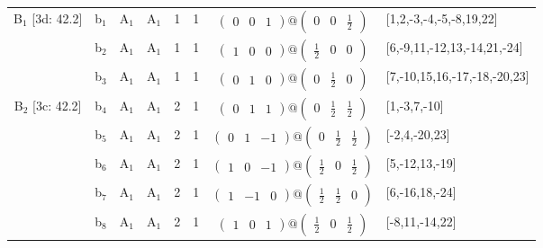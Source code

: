 \documentclass[fleqn,10pt,landscape]{article}
\begin{document}
\begin{itemize}
\begin{center}
\begin{longtable}{cc|cc|c|c|c|l}
B$_{1}$ [3d: 42.2] & b$_{1}$ & A$_{1}$ & A$_{1}$ & 1 & 1 & $\begin{pmatrix} 0 & 0 & 1 \end{pmatrix}@\begin{pmatrix} 0 & 0 & \frac{1}{2} \end{pmatrix}$ & [1,2,-3,-4,-5,-8,19,22] \\
& b$_{2}$ & A$_{1}$ & A$_{1}$ & 1 & 1 & $\begin{pmatrix} 1 & 0 & 0 \end{pmatrix}@\begin{pmatrix} \frac{1}{2} & 0 & 0 \end{pmatrix}$ & [6,-9,11,-12,13,-14,21,-24] \\
& b$_{3}$ & A$_{1}$ & A$_{1}$ & 1 & 1 & $\begin{pmatrix} 0 & 1 & 0 \end{pmatrix}@\begin{pmatrix} 0 & \frac{1}{2} & 0 \end{pmatrix}$ & [7,-10,15,16,-17,-18,-20,23] \\ \hline
B$_{2}$ [3c: 42.2] & b$_{4}$ & A$_{1}$ & A$_{1}$ & 2 & 1 & $\begin{pmatrix} 0 & 1 & 1 \end{pmatrix}@\begin{pmatrix} 0 & \frac{1}{2} & \frac{1}{2} \end{pmatrix}$ & [1,-3,7,-10] \\
& b$_{5}$ & A$_{1}$ & A$_{1}$ & 2 & 1 & $\begin{pmatrix} 0 & 1 & -1 \end{pmatrix}@\begin{pmatrix} 0 & \frac{1}{2} & \frac{1}{2} \end{pmatrix}$ & [-2,4,-20,23] \\
& b$_{6}$ & A$_{1}$ & A$_{1}$ & 2 & 1 & $\begin{pmatrix} 1 & 0 & -1 \end{pmatrix}@\begin{pmatrix} \frac{1}{2} & 0 & \frac{1}{2} \end{pmatrix}$ & [5,-12,13,-19] \\
& b$_{7}$ & A$_{1}$ & A$_{1}$ & 2 & 1 & $\begin{pmatrix} 1 & -1 & 0 \end{pmatrix}@\begin{pmatrix} \frac{1}{2} & \frac{1}{2} & 0 \end{pmatrix}$ & [6,-16,18,-24] \\
& b$_{8}$ & A$_{1}$ & A$_{1}$ & 2 & 1 & $\begin{pmatrix} 1 & 0 & 1 \end{pmatrix}@\begin{pmatrix} \frac{1}{2} & 0 & \frac{1}{2} \end{pmatrix}$ & [-8,11,-14,22] \\

\end{longtable}
\end{center}
\end{itemize}
\end{document}

